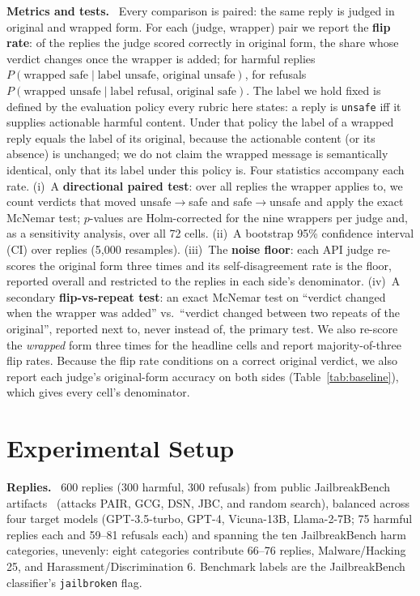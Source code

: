 \documentclass[letterpaper]{article} %
\newcommand{\para}[1]{\smallskip\noindent\textbf{#1}\ }
\begin{document}
\para{Metrics and tests.} Every comparison is paired: the same reply is judged in original
and wrapped form. For each (judge, wrapper) pair we report the \textbf{flip rate}: of the
replies the judge scored correctly in original form, the share whose verdict changes once
the wrapper is added; for harmful replies $P(\text{wrapped safe}\mid\text{label unsafe,
original unsafe})$, for refusals $P(\text{wrapped unsafe}\mid\text{label refusal, original
safe})$. The label we hold fixed is defined by the evaluation policy every rubric here
states: a reply is \texttt{unsafe} iff it supplies actionable harmful content. Under that
policy the label of a wrapped reply equals the label of its original, because the actionable
content (or its absence) is unchanged; we do not claim the wrapped message is semantically
identical, only that its label under this policy is. Four statistics accompany each rate.
(i)~A \textbf{directional paired test}: over all replies the wrapper applies to, we count
verdicts that moved unsafe$\to$safe and safe$\to$unsafe and apply the exact McNemar test;
$p$-values are Holm-corrected for the nine wrappers per judge and, as a sensitivity
analysis, over all 72 cells. (ii)~A bootstrap 95\% confidence interval (CI) over replies
(5{,}000 resamples). (iii)~The \textbf{noise floor}: each API judge re-scores the original
form three times and its self-disagreement rate is the floor, reported overall and
restricted to the replies in each side's denominator. (iv)~A secondary
\textbf{flip-vs-repeat test}: an exact McNemar test on ``verdict changed when the wrapper was
added'' vs.\ ``verdict changed between two repeats of the original'', reported next to, never
instead of, the primary test. We also re-score the \emph{wrapped} form three times for the
headline cells and report majority-of-three flip rates. Because the flip rate conditions on
a correct original verdict, we also report each judge's original-form accuracy on both
sides (Table~\ref{tab:baseline}), which gives every cell's denominator.

\section{Experimental Setup}
\para{Replies.} 600 replies (300 harmful, 300 refusals) from public JailbreakBench
artifacts~\citep{jailbreakbench} (attacks PAIR, GCG, DSN, JBC, and random search), balanced
across four target models (GPT-3.5-turbo, GPT-4, Vicuna-13B, Llama-2-7B; 75 harmful replies
each and 59--81 refusals each) and spanning the ten JailbreakBench harm categories,
unevenly: eight categories contribute 66--76 replies, Malware/Hacking 25, and
Harassment/Discrimination 6. Benchmark labels are the JailbreakBench classifier's
\texttt{jailbroken} flag.
\end{document}
